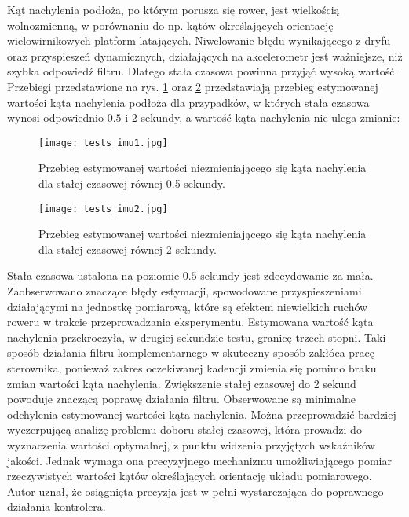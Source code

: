 Kąt nachylenia podłoża, po którym porusza się rower, jest wielkością wolnozmienną, w porównaniu do np. kątów określających orientację wielowirnikowych platform latających. Niwelowanie błędu wynikającego z dryfu oraz przyspieszeń dynamicznych, działających na akcelerometr jest ważniejsze, niż szybka odpowiedź filtru. Dlatego stała czasowa powinna przyjąć wysoką wartość. Przebiegi przedstawione na rys. \ref{fig:tests_imu1} oraz \ref{fig:tests_imu2} przedstawiają przebieg estymowanej wartości kąta nachylenia podłoża dla przypadków, w których stała czasowa wynosi odpowiednio $0.5$ i $2$ sekundy, a wartość kąta nachylenia nie ulega zmianie:
\begin{figure}[h]
    \centering
    \texttt{[image: tests\_imu1.jpg]}
    \caption{Przebieg estymowanej wartości niezmieniającego się kąta nachylenia dla stałej czasowej równej 0.5 sekundy.}
    \label{fig:tests_imu1}
\end{figure}

\begin{figure}[h]
    \centering
    \texttt{[image: tests\_imu2.jpg]}
    \caption{Przebieg estymowanej wartości niezmieniającego się kąta nachylenia dla stałej czasowej równej 2 sekundy.}
    \label{fig:tests_imu2}
\end{figure}
Stała czasowa ustalona na poziomie $0.5$ sekundy jest zdecydowanie za mała. Zaobserwowano znaczące błędy estymacji, spowodowane  przyspieszeniami działającymi na jednostkę pomiarową, które są efektem niewielkich ruchów roweru w trakcie przeprowadzania eksperymentu. Estymowana wartość kąta nachylenia przekroczyła, w drugiej sekundzie testu, granicę trzech stopni. Taki sposób działania filtru komplementarnego w skuteczny sposób zakłóca pracę sterownika, ponieważ zakres oczekiwanej kadencji zmienia się pomimo braku zmian wartości kąta nachylenia. Zwiększenie stałej czasowej do 2 sekund powoduje znaczącą poprawę działania filtru. Obserwowane są minimalne odchylenia estymowanej wartości kąta nachylenia. Można przeprowadzić bardziej wyczerpującą analizę problemu doboru stałej czasowej, która prowadzi do wyznaczenia wartości optymalnej, z punktu widzenia przyjętych wskaźników jakości. Jednak wymaga ona precyzyjnego mechanizmu umożliwiającego pomiar rzeczywistych wartości kątów określających orientację układu pomiarowego. Autor uznał, że osiągnięta precyzja jest w pełni wystarczająca do poprawnego działania kontrolera.



